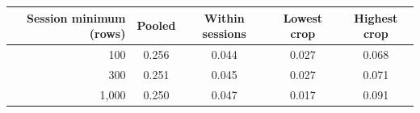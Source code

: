 \begin{tabular}{rcccc}
\toprule
Session minimum (rows) & Pooled & Within sessions & Lowest crop & Highest crop \\
\midrule
100 & 0.256 & 0.044 & 0.027 & 0.068 \\
300 & 0.251 & 0.045 & 0.027 & 0.071 \\
1{,}000 & 0.250 & 0.047 & 0.017 & 0.091 \\
\bottomrule
\end{tabular}
